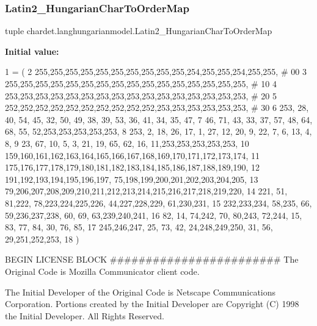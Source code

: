 \mbox{\label{namespacechardet_1_1langhungarianmodel_a991e006c409e723d9fa539e596ddbe73}} 
\subsubsection{\texorpdfstring{Latin2\+\_\+\+Hungarian\+Char\+To\+Order\+Map}{Latin2\_HungarianCharToOrderMap}}
{\footnotesize\ttfamily tuple chardet.\+langhungarianmodel.\+Latin2\+\_\+\+Hungarian\+Char\+To\+Order\+Map}

{\bfseries Initial value\+:}
\begin{DoxyCode}
1 =  (
2 255,255,255,255,255,255,255,255,255,255,254,255,255,254,255,255,  \textcolor{comment}{# 00}
3 255,255,255,255,255,255,255,255,255,255,255,255,255,255,255,255,  \textcolor{comment}{# 10}
4 253,253,253,253,253,253,253,253,253,253,253,253,253,253,253,253,  \textcolor{comment}{# 20}
5 252,252,252,252,252,252,252,252,252,252,253,253,253,253,253,253,  \textcolor{comment}{# 30}
6 253, 28, 40, 54, 45, 32, 50, 49, 38, 39, 53, 36, 41, 34, 35, 47,
7  46, 71, 43, 33, 37, 57, 48, 64, 68, 55, 52,253,253,253,253,253,
8 253,  2, 18, 26, 17,  1, 27, 12, 20,  9, 22,  7,  6, 13,  4,  8,
9  23, 67, 10,  5,  3, 21, 19, 65, 62, 16, 11,253,253,253,253,253,
10 159,160,161,162,163,164,165,166,167,168,169,170,171,172,173,174,
11 175,176,177,178,179,180,181,182,183,184,185,186,187,188,189,190,
12 191,192,193,194,195,196,197, 75,198,199,200,201,202,203,204,205,
13  79,206,207,208,209,210,211,212,213,214,215,216,217,218,219,220,
14 221, 51, 81,222, 78,223,224,225,226, 44,227,228,229, 61,230,231,
15 232,233,234, 58,235, 66, 59,236,237,238, 60, 69, 63,239,240,241,
16  82, 14, 74,242, 70, 80,243, 72,244, 15, 83, 77, 84, 30, 76, 85,
17 245,246,247, 25, 73, 42, 24,248,249,250, 31, 56, 29,251,252,253,
18 )
\end{DoxyCode}


B\+E\+G\+IN L\+I\+C\+E\+N\+SE B\+L\+O\+CK \#\#\#\#\#\#\#\#\#\#\#\#\#\#\#\#\#\#\#\#\#\#\#\# The Original Code is Mozilla Communicator client code. 

The Initial Developer of the Original Code is Netscape Communications Corporation. Portions created by the Initial Developer are Copyright (C) 1998 the Initial Developer. All Rights Reserved.

